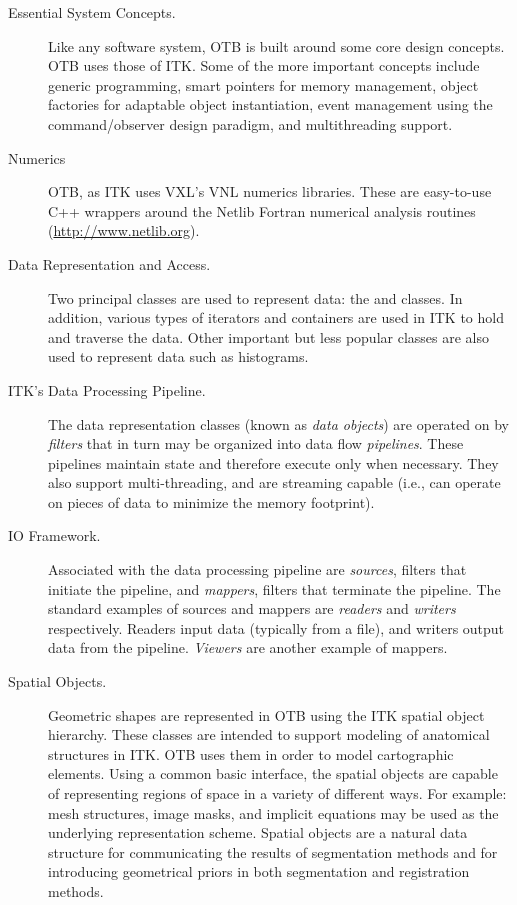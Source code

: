 \begin{description}
	\item[Essential System Concepts.] Like any software system, OTB is
        built around some core design concepts. OTB uses those of
        ITK. Some of the more important
        concepts include generic programming, smart pointers for memory
        management, object factories for adaptable object instantiation,
        event management using the command/observer design paradigm, and
        multithreading support.

	\item[Numerics] OTB, as ITK uses VXL's VNL numerics libraries. These are
        easy-to-use C++ wrappers around the Netlib Fortran numerical 
        analysis routines (\url{http://www.netlib.org}).

	\item[Data Representation and Access.]  Two principal classes
        are used to represent data: the  and
         classes.  In addition, various types of
        iterators and containers are used in ITK to hold and traverse
        the data. Other important but less popular classes are also
        used to represent data such as histograms.

	\item[ITK's Data Processing Pipeline.]  The data representation
	classes (known as \emph{data objects}) are operated on by
	\emph{filters} that in turn may be organized into data flow
	\emph{pipelines}. These pipelines maintain state and therefore
	execute only when necessary.  They also support
	multi-threading, and are streaming capable (i.e., can operate
	on pieces of data to minimize the memory footprint).

        \item[IO Framework.] Associated with the data processing
        pipeline are \emph{sources}, filters that initiate the
        pipeline, and \emph{mappers}, filters that terminate the
        pipeline.  The standard examples of sources and mappers are
        \emph{readers} and \emph{writers} respectively.  Readers
        input data (typically from a file), and writers output data
        from the pipeline. \emph{Viewers} are another example of mappers.

	\item[Spatial Objects.] Geometric shapes are represented in
        OTB using the ITK spatial object hierarchy.  These classes are
        intended to support modeling of anatomical structures in
        ITK. OTB uses them in order to model cartographic elements. Using a
        common basic interface, the spatial objects are capable of
        representing regions of space in a variety of different
        ways. For example: mesh structures, image masks, and implicit
        equations may be used as the underlying representation scheme.
        Spatial objects are a natural data structure for communicating
        the results of segmentation methods and for introducing
        geometrical priors in both segmentation and registration
        methods.


\end{description}
